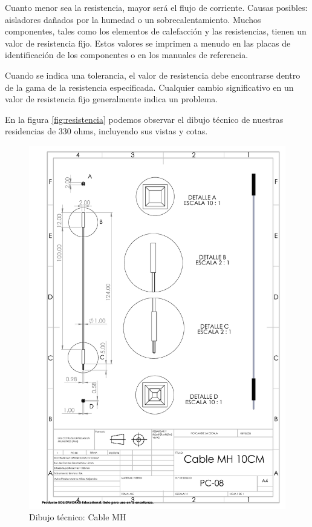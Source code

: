     Cuanto menor sea la resistencia, mayor será el flujo de corriente. Causas posibles: aisladores dañados por la humedad o un sobrecalentamiento.
    Muchos componentes, tales como los elementos de calefacción y las resistencias, tienen un valor de resistencia fijo. Estos valores se imprimen a menudo en las placas de identificación de los componentes o en los manuales de referencia.
    
    Cuando se indica una tolerancia, el valor de resistencia debe encontrarse dentro de la gama de la resistencia especificada. Cualquier cambio significativo en un valor de resistencia fijo generalmente indica un problema. \cite{Fluke}
    
    
     En la figura \ref{fig:resistencia} podemos observar el dibujo técnico de nuestras residencias de 330 ohms, incluyendo sus vistas y cotas.
     \begin{figure}[H]
        \centering
        \includegraphics[trim = {7mm 1mm 1mm 1mm},clip,scale=0.4]{22/Img/cableMHDibujo.PDF}
        \caption{Dibujo técnico: Cable MH}
        \label{fig:Cable MH}
    \end{figure}
    
